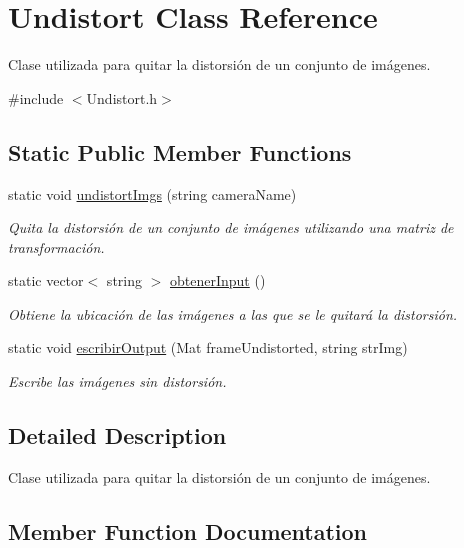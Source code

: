 \hypertarget{classUndistort}{}\section{Undistort Class Reference}
\label{classUndistort}


Clase utilizada para quitar la distorsión de un conjunto de imágenes.  




{\ttfamily \#include $<$Undistort.\+h$>$}

\subsection*{Static Public Member Functions}
\begin{DoxyCompactItemize}
\item 
static void \mbox{\hyperlink{classUndistort_a1082f78a003fca5fca34a8181796561f}{undistort\+Imgs}} (string camera\+Name)
\begin{DoxyCompactList}\small\item\em Quita la distorsión de un conjunto de imágenes utilizando una matriz de transformación. \end{DoxyCompactList}\item 
static vector$<$ string $>$ \mbox{\hyperlink{classUndistort_a72d7d2e5eae6b78c822a11feb5231644}{obtener\+Input}} ()
\begin{DoxyCompactList}\small\item\em Obtiene la ubicación de las imágenes a las que se le quitará la distorsión. \end{DoxyCompactList}\item 
static void \mbox{\hyperlink{classUndistort_a5179286860682effd17fcc2c1da2169e}{escribir\+Output}} (Mat frame\+Undistorted, string str\+Img)
\begin{DoxyCompactList}\small\item\em Escribe las imágenes sin distorsión. \end{DoxyCompactList}\end{DoxyCompactItemize}


\subsection{Detailed Description}
Clase utilizada para quitar la distorsión de un conjunto de imágenes. 

\subsection{Member Function Documentation}
\mbox{\label{classUndistort_a5179286860682effd17fcc2c1da2169e}} 
